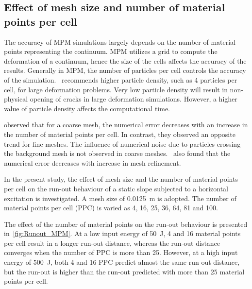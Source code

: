 \subsection{Effect of mesh size and number of material points per cell}
\label{sec:MPM_points_per_cell}

The accuracy of MPM simulations largely depends on the number of material 
points representing the continuum. MPM utilizes a grid to compute the 
deformation of a continuum, hence the size of the cells affects the accuracy 
of the results. Generally in MPM, the number of particles per cell controls 
the accuracy of the simulation.~\citet{Guilkey2003} recommends higher particle 
density, such as 4 particles per cell, for large deformation problems. Very low 
particle density will result in non-physical opening of cracks in large 
deformation simulations. However, a higher value of particle density affects 
the computational time. 

\citet{Abe2013} observed that for a coarse mesh, the numerical error 
decreases with an increase in the number of material points per cell. In 
contrast, they observed an opposite trend for fine meshes. The influence of 
numerical noise due to particles crossing the background mesh is not observed 
in coarse meshes.~\citet{Coetzee2005} also found that the numerical error 
decreases with increase in mesh refinement.

In the present study, the effect of mesh size and the number of material points 
per cell on the run-out behaviour of a static slope subjected to a horizontal 
excitation is investigated. A mesh size of 0.0125~\si{\m} is adopted. The 
number of material points per cell (PPC) is varied as 4, 16, 25, 36, 64, 81 and 
100.

The effect of the number of material points on the run-out behaviour is 
presented in~\cref{fig:Runout_MPM}. At a low input energy of 50~\si{\J}, 4 and 
16 material points per cell result in a longer run-out distance, whereas the 
run-out distance converges when the number of PPC is more than 25. However, at 
a high input energy of 500~\si{J}, both 4 and 16 PPC predict almost the same 
run-out distance, but the run-out is higher than the run-out predicted with 
more than 25 material points per cell. 

